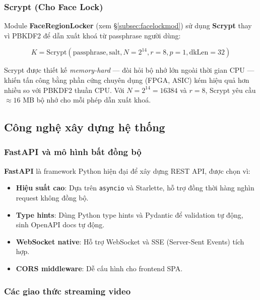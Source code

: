 \subsubsection{Scrypt (Cho Face Lock)}
\label{subsubsec:scrypt}

Module \textbf{FaceRegionLocker} (xem §\ref{subsec:facelockmod}) sử dụng \textbf{Scrypt} \cite{percival2009scrypt} thay vì PBKDF2 để dẫn xuất khoá từ passphrase người dùng:

\begin{equation}
    K = \text{Scrypt}(\text{passphrase}, \text{salt}, N=2^{14}, r=8, p=1, \text{dkLen}=32)
\end{equation}

Scrypt được thiết kế \textit{memory-hard} --- đòi hỏi bộ nhớ lớn ngoài thời gian CPU --- khiến tấn công bằng phần cứng chuyên dụng (FPGA, ASIC) kém hiệu quả hơn nhiều so với PBKDF2 thuần CPU. Với $N = 2^{14} = 16384$ và $r = 8$, Scrypt yêu cầu $\approx 16$ MB bộ nhớ cho mỗi phép dẫn xuất khoá.

\subsection{Công nghệ xây dựng hệ thống}
\label{subsec:congnghe}

\subsubsection{FastAPI và mô hình bất đồng bộ}
\label{subsubsec:fastapi}

\textbf{FastAPI} \cite{fastapi} là framework Python hiện đại để xây dựng REST API, được chọn vì:
\begin{itemize}
    \item \textbf{Hiệu suất cao}: Dựa trên \texttt{asyncio} và Starlette, hỗ trợ đồng thời hàng nghìn request không đồng bộ.
    \item \textbf{Type hints}: Dùng Python type hints và Pydantic để validation tự động, sinh OpenAPI docs tự động.
    \item \textbf{WebSocket native}: Hỗ trợ WebSocket và SSE (Server-Sent Events) tích hợp.
    \item \textbf{CORS middleware}: Dễ cấu hình cho frontend SPA.
\end{itemize}

\subsubsection{Các giao thức streaming video}
\label{subsubsec:streaming}

